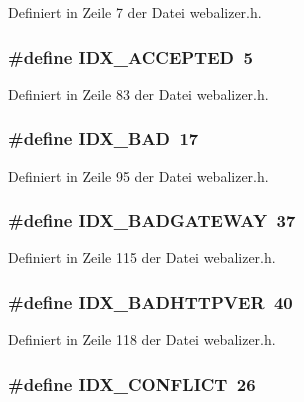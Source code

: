 Definiert in Zeile 7 der Datei webalizer.h.
\subsubsection{\setlength{\rightskip}{0pt plus 5cm}\#define IDX\_\-ACCEPTED~5}\label{webalizer_8h_933e0eb54658be0ad274c542b96b143d}




Definiert in Zeile 83 der Datei webalizer.h.
\subsubsection{\setlength{\rightskip}{0pt plus 5cm}\#define IDX\_\-BAD~17}\label{webalizer_8h_48260339557cf3534665eb05912a1868}




Definiert in Zeile 95 der Datei webalizer.h.
\subsubsection{\setlength{\rightskip}{0pt plus 5cm}\#define IDX\_\-BADGATEWAY~37}\label{webalizer_8h_2de048827e8a84dab33a5421e9eb2819}




Definiert in Zeile 115 der Datei webalizer.h.
\subsubsection{\setlength{\rightskip}{0pt plus 5cm}\#define IDX\_\-BADHTTPVER~40}\label{webalizer_8h_e4191d0093c406af5911ea618427431c}




Definiert in Zeile 118 der Datei webalizer.h.
\subsubsection{\setlength{\rightskip}{0pt plus 5cm}\#define IDX\_\-CONFLICT~26}\label{webalizer_8h_80993fd20ef234e37cd81707101a93e5}




